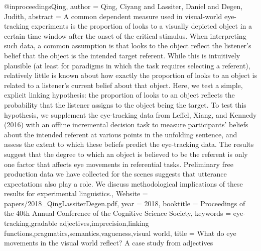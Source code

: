 @inproceedings{Qing,
author = {Qing, Ciyang and Lassiter, Daniel and Degen, Judith},
abstract = {A common dependent measure used in visual-world eye-tracking experiments is the proportion of looks to a visually depicted object in a certain time window after the onset of the critical stimulus. When interpreting such data, a common assumption is that looks to the object reflect the listener’s belief that the object is the intended target referent. While this is intuitively plausible (at least for paradigms in which the task requires selecting a referent), relatively little is known about how exactly the proportion of looks to an object is related to a listener’s current belief about that object. Here, we test a simple, explicit linking hypothesis: the proportion of looks to an object reflects the probability that the listener assigns to the object being the target. To test this hypothesis, we supplement the eye-tracking data from Leffel, Xiang, and Kennedy (2016) with an offline incremental decision task to measure participants’ beliefs about the intended referent at various points in the unfolding sentence, and assess the extent to which these beliefs predict the eye-tracking data. The results suggest that the degree to which an object is believed to be the referent is only one factor that affects eye movements in referential tasks. Preliminary free production data we have collected for the scenes suggests that utterance expectations also play a role. We discuss methodological implications of these results for experimental linguistics.},
Website = {papers/2018_QingLassiterDegen.pdf},
year = {2018},
booktitle = {Proceedings of the 40th Annual Conference of the Cognitive Science Society},
keywords = {eye-tracking,gradable adjectives,imprecision,linking functions,pragmatics,semantics,vagueness,visual world},
title = {{What do eye movements in the visual world reflect? A case study from adjectives}}
}
